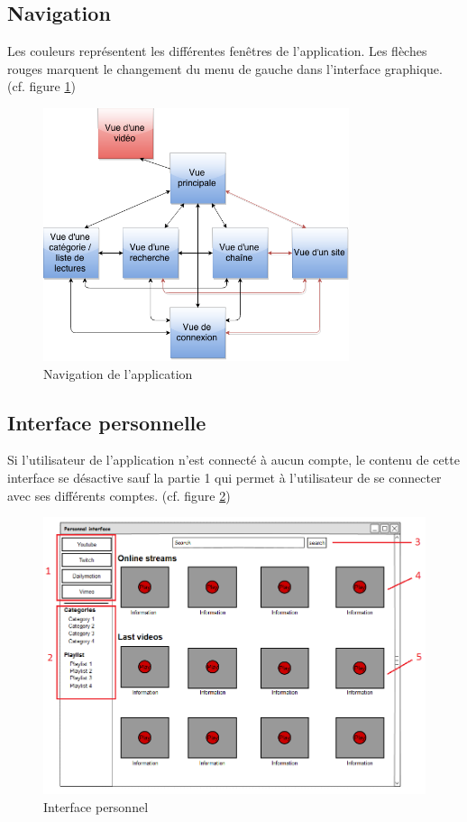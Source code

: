 \documentclass[11pt]{report} %
\begin{document}
		\newpage
		\subsection{Navigation}
		Les couleurs représentent les différentes fenêtres de l'application. Les flèches rouges marquent le changement du menu de gauche dans l'interface graphique. (cf. figure \ref{navigation})
		
		\begin{figure}[h]
			\center
			\includegraphics[width=0.8\textwidth]{../img/navigation.png}
			\caption{Navigation de l'application}
			\label{navigation}
		\end{figure}
		
		\subsection{Interface personnelle}
		Si l'utilisateur de l'application n'est connecté à aucun compte, le contenu de cette interface se désactive sauf la partie 1 qui permet à l'utilisateur de se connecter avec ses différents comptes. (cf. figure \ref{interfacepersonnel})
		\begin{figure}[h]
			\center
			\includegraphics[width=1\textwidth]{../img/personnalInterfacenum.png}
			\caption{Interface personnel}
			\label{interfacepersonnel}
		\end{figure}
		
\end{document}
